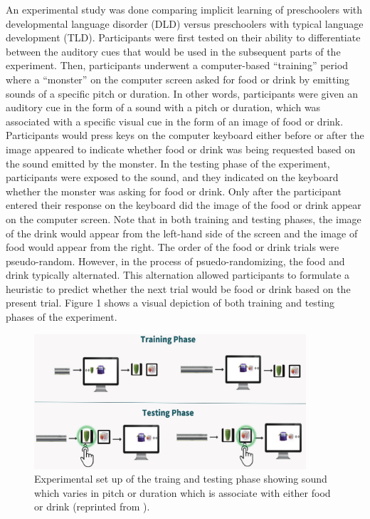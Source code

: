 \documentclass[
  letterpaper,
]{report}
\begin{document}
An experimental study was done comparing implicit learning of
preschoolers with developmental language disorder (DLD) versus
preschoolers with typical language development (TLD). Participants were
first tested on their ability to differentiate between the auditory cues
that would be used in the subsequent parts of the experiment. Then,
participants underwent a computer-based ``training'' period where a
``monster'' on the computer screen asked for food or drink by emitting
sounds of a specific pitch or duration. In other words, participants
were given an auditory cue in the form of a sound with a pitch or
duration, which was associated with a specific visual cue in the form of
an image of food or drink. Participants would press keys on the computer
keyboard either before or after the image appeared to indicate whether
food or drink was being requested based on the sound emitted by the
monster. In the testing phase of the experiment, participants were
exposed to the sound, and they indicated on the keyboard whether the
monster was asking for food or drink. Only after the participant entered
their response on the keyboard did the image of the food or drink appear
on the computer screen. Note that in both training and testing phases,
the image of the drink would appear from the left-hand side of the
screen and the image of food would appear from the right. The order of
the food or drink trials were pseudo-random. However, in the process of
psuedo-randomizing, the food and drink typically alternated. This
alternation allowed participants to formulate a heuristic to predict
whether the next trial would be food or drink based on the present
trial. Figure 1 shows a visual depiction of both training and testing
phases of the experiment.

\begin{figure}

{\centering \includegraphics[width=0.9\textwidth,height=\textheight]{../../visualization/preschoolers_exp_setup.png}

}

\caption{Experimental set up of the traing and testing phase showing
sound which varies in pitch or duration which is associate with either
food or drink (reprinted from
\textcite{cairns_crystal_l_implicit_2022}).}

\end{figure}
\end{document}
